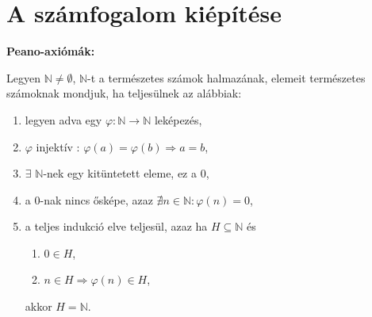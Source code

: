 \clearpage
\section{A számfogalom kiépítése}\label{sec-01-03}

\begin{blueBox}
  \bgroup
  \sffamily\bfseries Peano-axiómák:
  \egroup

  Legyen $ \mathbb N \neq \emptyset$, $\mathbb N$-t a természetes számok
  halmazának, elemeit természetes számoknak mondjuk, ha teljesülnek az alábbiak:
  \begin{enumerate}
    \item legyen adva egy $\varphi : \mathbb N \rightarrow \mathbb N$ leképezés,
    \item $\varphi$ injektív : $\varphi(a) = \varphi(b) \Rightarrow a = b$,
    \item $\exists$ $\mathbb N$-nek egy kitüntetett eleme, ez a $0$,
    \item a $0$-nak nincs ősképe, azaz $\nexists n \in \mathbb N : \varphi(n) =
            0$,
    \item a teljes indukció elve teljesül, azaz ha $H \subseteq \mathbb N$ és
          \begin{enumerate}
            \item $0 \in H$,
            \item $n \in H \Rightarrow \varphi(n) \in H$,
          \end{enumerate}
          akkor $H = \mathbb N$.
  \end{enumerate}
\end{blueBox}

